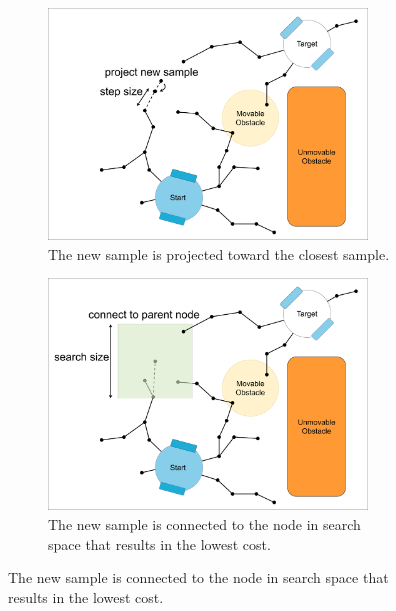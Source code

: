 \begin{figure}[H]
    \begin{subfigure}{.49\textwidth}
    \centering
    \includegraphics[width=0.93\textwidth, cfbox=my_light_blue 5pt 0pt]{figures/mp/3mp_project_sample.drawio.png}
    \caption{The new sample is projected toward the closest sample.\bs}
    \end{subfigure}
    \begin{subfigure}{.49\textwidth}
    \centering
    \includegraphics[width=0.93\textwidth, cfbox=my_yellow 5pt 0pt]{figures/mp/4mp_connect_to_tree.drawio.png}
    \caption{The new sample is connected to the node in search space that results in the lowest cost.}
    \end{subfigure}


\end{figure}
